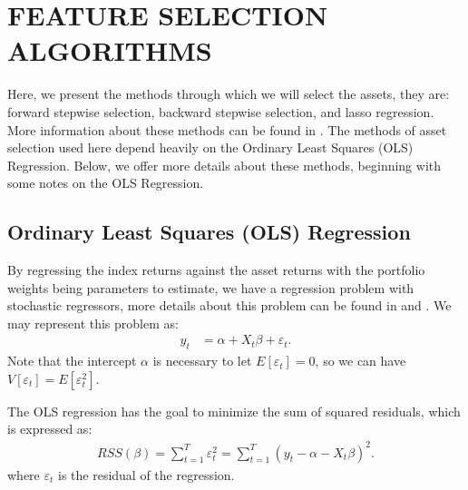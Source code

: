 \documentclass[12pt,oneside,a4paper]{memoir}
\begin{document}
\section{FEATURE SELECTION ALGORITHMS} \label{sec:selection}

Here, we present the methods through which we will select the assets, they are:
forward stepwise selection, backward stepwise selection, and lasso regression.
More information about these methods can be found in .
The methods of asset selection used here depend heavily on the Ordinary Least Squares (OLS) Regression.
Below, we offer more details about these methods, beginning with some notes on the OLS Regression.

\subsection{Ordinary Least Squares (OLS) Regression}

By regressing the index returns against the asset returns with the portfolio weights being parameters to estimate, we have a regression problem with stochastic regressors, more details about this problem can be found in  and .
We may represent this problem as:
\begin{align*} 
	y_{t} &= \alpha + X_{t}\beta + \varepsilon_{t}.
\end{align*}
Note that the intercept $\alpha$ is necessary to let $E[\varepsilon_{t}]=0$, so we can have $V[\varepsilon_{t}] = E[\varepsilon_{t}^2]$.

The OLS regression has the goal to minimize the sum of squared residuals, which is expressed as:
\begin{align} \label{eq:rss}
	RSS(\beta)
	= \sum_{t=1}^{T} \varepsilon_t^2
	= \sum_{t=1}^{T} (y_t - \alpha - X_t \beta)^2.
\end{align}
where $\varepsilon_{t}$ is the residual of the regression.
\end{document}
